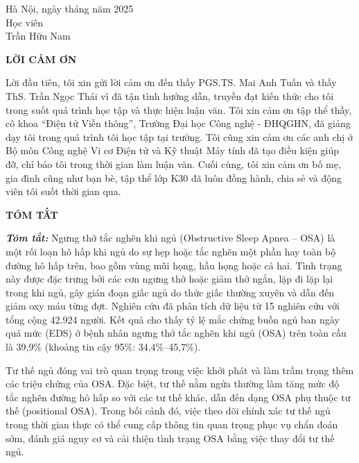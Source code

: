 \begin{flushright}
	\begin{varwidth}{\linewidth}\centering
		Hà Nội, ngày \space\space\space\space tháng  \space\space\space\space năm 2025\\
		Học viên\\[2cm]
		Trần Hữu Nam
	\end{varwidth}
\end{flushright}

\newpage

\begin{center}
	\textbf{LỜI CẢM ƠN}
\end{center}

Lời đầu tiên, tôi xin gửi lời cảm ơn đến thầy PGS.TS. Mai Anh Tuấn và thầy ThS.
Trần Ngọc Thái vì đã tận tình hướng dẫn, truyền đạt kiến thức cho tôi trong
suốt quá trình học tập và thực hiện luận văn. Tôi xin cảm ơn tập thể thầy, cô
khoa “Điện tử Viễn thông”, Trường Đại học Công nghệ - ĐHQGHN, đã giảng dạy tôi
trong quá trình tôi học tập tại trường. Tôi cũng xin cảm ơn các anh chị ở Bộ
môn Công nghệ Vi cơ Điện tử và Kỹ thuật Máy tính đã tạo điều kiện giúp đỡ, chỉ
bảo tôi trong thời gian làm luận văn. Cuối cùng, tôi xin cảm ơn bố mẹ, gia đình
cũng như bạn bè, tập thể lớp K30 đã luôn đồng hành, chia sẻ và động viên tôi
suốt thời gian qua.

\newpage
{}
\begin{center}
	\textbf{TÓM TẮT}
\end{center}
\textit{\textbf{Tóm tắt: }}
Ngưng thở tắc nghẽn khi ngủ (Obstructive Sleep Apnea – OSA) là một rối loạn
hô hấp khi ngủ do sự hẹp hoặc tắc nghẽn một phần hay toàn bộ đường hô hấp
trên, bao gồm vùng mũi họng, hầu họng hoặc cả hai. Tình trạng này được đặc
trưng bởi các cơn ngưng thở hoặc giảm thở ngắn, lặp đi lặp lại trong khi ngủ,
gây gián đoạn giấc ngủ do thức giấc thường xuyên và dẫn đến giảm oxy máu
từng đợt\cite{Epstein2009}. Nghiên
cứu\cite{Salari2025} đã phân tích dữ liệu từ 15 nghiên cứu với tổng cộng 42.924
người. Kết quả cho thấy tỷ lệ mắc chứng buồn ngủ ban ngày quá mức (EDS) ở bệnh
nhân ngưng thở tắc nghẽn khi ngủ (OSA) trên toàn cầu là 39,9\% (khoảng tin cậy
95\%: 34,4\%–45,7\%).

Tư thế ngủ đóng vai trò quan trọng trong việc khởi phát và làm trầm trọng thêm
các triệu chứng của OSA. Đặc biệt, tư thế nằm ngửa thường làm tăng mức độ tắc
nghẽn đường hô hấp so với các tư thế khác, dẫn đến dạng OSA phụ thuộc tư thế
(positional OSA). Trong bối cảnh đó, việc theo dõi chính xác tư thế ngủ trong
thời gian thực có thể cung cấp thông tin quan trọng phục vụ chẩn đoán sớm, đánh
giá nguy cơ và cải thiện tình trạng OSA bằng việc thay đổi tư thế ngủ.


